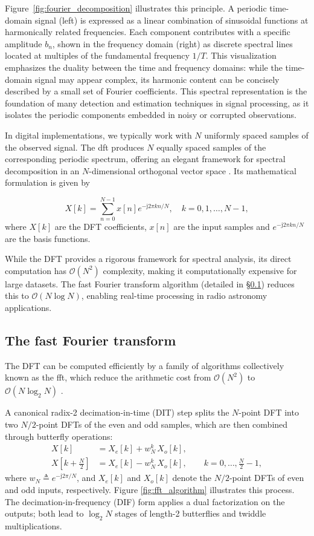 Figure~\ref{fig:fourier_decomposition} illustrates this principle. A periodic time-domain signal (left) is expressed as a linear combination of sinusoidal functions at harmonically related frequencies. Each component contributes with a specific amplitude $b_n$, shown in the frequency domain (right) as discrete spectral lines located at multiples of the fundamental frequency $1/T$. This visualization emphasizes the duality between the time and frequency domains: while the time-domain signal may appear complex, its harmonic content can be concisely described by a small set of Fourier coefficients. This spectral representation is the foundation of many detection and estimation techniques in signal processing, as it isolates the periodic components embedded in noisy or corrupted observations.

In digital implementations, we typically work with $N$ uniformly spaced samples of the observed signal. The \Gls{dft} produces $N$ equally spaced samples of the corresponding periodic spectrum, offering an elegant framework for spectral decomposition in an $N$-dimensional orthogonal vector space \citep{Cooley1969finite}. Its mathematical formulation is given by

\begin{equation}
X[k] = \sum_{n=0}^{N-1} x[n] e^{-\mathrm{j} 2 \pi k n / N}, \quad k = 0, 1, \ldots, N-1,
\end{equation}
where $X[k]$ are the DFT coefficients, $x[n]$ are the input samples and $e^{-\mathrm{j} 2 \pi k n / N}$ are the basis functions.

While the DFT provides a rigorous framework for spectral analysis, its direct computation has $\mathcal{O}(N^2)$ complexity, making it computationally expensive for large datasets. The fast Fourier transform algorithm (detailed in \S\ref{sec:fft}) reduces this to $\mathcal{O}(N \log N)$, enabling real-time processing in radio astronomy applications. 

\subsection{The fast Fourier transform}
\label{sec:fft}
The DFT can be computed efficiently by a family of algorithms collectively known as the \Gls{fft}, which reduce the arithmetic cost from $\mathcal{O}(N^2)$ to $\mathcal{O}(N\log_2 N)$ \citep{CooleyTukey1965,OppenheimSchafer2010}.

A canonical radix-2 decimation-in-time (DIT) step splits the $N$-point DFT into two $N/2$-point DFTs of the even and odd samples, which are then combined through butterfly operations:
\begin{align}
X[k] &= X_e[k] + w_N^k\, X_o[k],\\
X[k+\tfrac{N}{2}] &= X_e[k] - w_N^k\, X_o[k], \qquad k=0,\dots,\tfrac{N}{2}-1,
\end{align}
where $w_N \triangleq e^{-\mathrm{j}2\pi/N}$, and $X_e[k]$ and $X_o[k]$ denote the $N/2$-point DFTs of even and odd inputs, respectively. Figure \ref{fig:fft_algorithm} illustrates this process. The decimation-in-frequency (DIF) form applies a dual factorization on the outputs; both lead to $\log_2 N$ stages of length-2 butterflies and twiddle multiplications.

